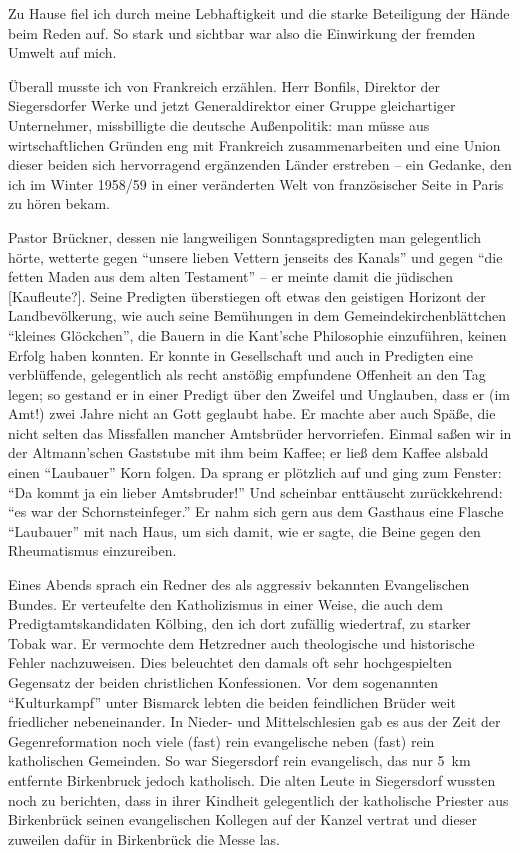 \documentclass[a5paper,pagesize,10pt,twoside=true]{scrbook}
\renewcommand{\marginpar}[2][]{}
\begin{document}
Zu Hause fiel ich durch meine Lebhaftigkeit und die starke Beteiligung der Hände \marginpar{145}beim Reden auf. So stark und sichtbar war also die Einwirkung der fremden Umwelt auf mich.

Überall musste ich von Frankreich erzählen. Herr Bonfils, Direktor der Siegersdorfer Werke und jetzt Generaldirektor einer Gruppe gleichartiger Unternehmer, missbilligte die deutsche Außenpolitik: man müsse aus wirtschaftlichen Gründen eng mit Frankreich zusammenarbeiten und eine Union dieser beiden sich hervorragend ergänzenden Länder erstreben -- ein Gedanke, den ich im Winter 1958/59 in einer veränderten Welt von französischer Seite in Paris zu hören bekam.

Pastor Brückner, dessen nie langweiligen Sonntagspredigten man gelegentlich hörte, wetterte gegen \enquote{unsere lieben Vettern jenseits des Kanals} und gegen \enquote{die fetten Maden aus dem alten Testament} -- er meinte damit die jüdischen [Kaufleute?]. Seine Predigten überstiegen oft etwas den geistigen Horizont der Landbevölkerung, wie auch seine Bemühungen in dem Gemeindekirchenblättchen \enquote{kleines Glöckchen}, die Bauern in die Kant'sche Philosophie einzuführen, keinen Erfolg haben konnten. Er konnte in Gesellschaft und auch in Predigten eine verblüffende, gelegentlich als recht anstößig empfundene Offenheit an den Tag legen; so gestand er in einer Predigt über den Zweifel und Unglauben, dass er (im Amt!) zwei Jahre nicht an Gott geglaubt habe. Er machte aber auch Späße, die nicht selten das Missfallen mancher Amtsbrüder hervorriefen. Einmal saßen wir in der Altmann'schen Gaststube mit ihm beim Kaffee; er ließ dem Kaffee alsbald einen \enquote{Laubauer} Korn folgen. Da sprang er plötzlich auf und ging zum Fenster: \enquote{Da kommt ja ein lieber Amtsbruder!} Und scheinbar enttäuscht zurückkehrend: \enquote{es war der Schornsteinfeger.} Er nahm sich gern aus dem Gasthaus eine Flasche \enquote{Laubauer} mit nach Haus, um sich damit, wie er sagte, die Beine gegen den Rheumatismus einzureiben.

Eines Abends sprach ein Redner des als aggressiv bekannten Evangelischen Bundes. Er verteufelte den Katholizismus in einer Weise, die auch dem Predigtamtskandidaten Kölbing, den ich dort zufällig wiedertraf, zu starker Tobak war. Er vermochte dem Hetzredner auch theologische und historische Fehler nachzuweisen. Dies beleuchtet den damals oft sehr hochgespielten Gegensatz der beiden christlichen Konfessionen. Vor dem sogenannten \enquote{Kulturkampf} unter Bismarck lebten die beiden feindlichen Brüder weit friedlicher nebeneinander. In Nieder- und Mittelschlesien gab es aus der Zeit der Gegenreformation noch viele (fast) rein evangelische neben (fast) rein katholischen Gemeinden. So war Siegersdorf rein evangelisch, das nur 5~km entfernte Birkenbruck jedoch katholisch. Die alten Leute in Siegersdorf wussten noch zu berichten, dass in ihrer Kindheit gelegentlich der katholische Priester aus Birkenbrück seinen evangelischen Kollegen auf der Kanzel vertrat und dieser zuweilen dafür in Birkenbrück die Messe las.
\end{document}
